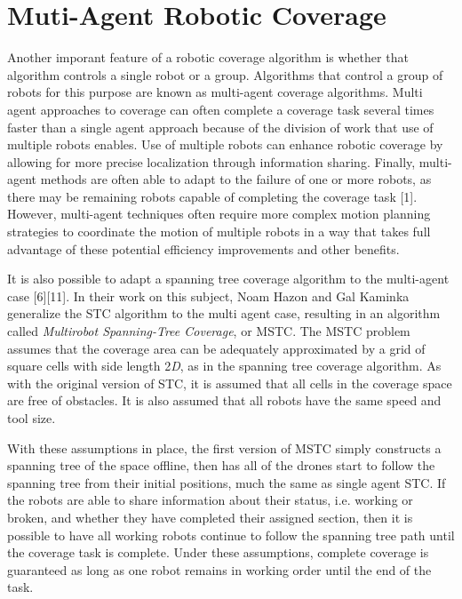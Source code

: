\documentclass[letterpaper, 12pt, leqno]{report}
\begin{document}
\section{Muti-Agent Robotic Coverage}

Another imporant feature of a robotic coverage algorithm is whether that algorithm controls a single robot or a group. Algorithms that control a group of robots for this purpose are known as multi-agent coverage algorithms. Multi agent approaches to coverage can often complete a coverage task several times faster than a single agent approach because of the division of work that use of multiple robots enables. Use of multiple robots can enhance robotic coverage by allowing for more precise localization through information sharing. Finally, multi-agent methods are often able to adapt to the failure of one or more robots, as there may be remaining robots capable of completing the coverage task [1]. However, multi-agent techniques often require more complex motion planning strategies to coordinate the motion of multiple robots in a way that takes full advantage of these potential efficiency improvements and other benefits.

It is also possible to adapt a spanning tree coverage algorithm to the multi-agent case [6][11]. In their work on this subject, Noam Hazon and Gal Kaminka generalize the STC algorithm to the multi agent case, resulting in an algorithm called \textit{Multirobot Spanning-Tree Coverage}, or MSTC. The MSTC problem assumes that the coverage area can be adequately approximated by a grid of square cells with side length 2\textit{D}, as in the spanning tree coverage algorithm. As with the original version of STC, it is assumed that all cells in the coverage space are free of obstacles. It is also assumed that all robots have the same speed and tool size.

With these assumptions in place, the first version of MSTC simply constructs a spanning tree of the space offline, then has all of the drones start to follow the spanning tree from their initial positions, much the same as single agent STC. If the robots are able to share information about their status, i.e. working or broken, and whether they have completed their assigned section, then it is possible to have all working robots continue to follow the spanning tree path until the coverage task is complete. Under these assumptions, complete coverage is guaranteed as long as one robot remains in working order until the end of the task.
\end{document}

